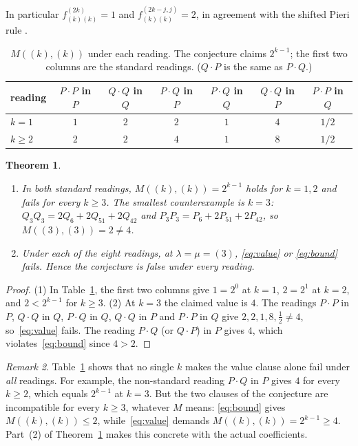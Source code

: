 \documentclass[11pt]{article}
\newtheorem{theorem}{Theorem}
\theoremstyle{definition}
\theoremstyle{remark}
\newtheorem{remark}[theorem]{Remark}
\begin{document}
In particular $f^{(2k)}_{(k)(k)}=1$ and $f^{(2k-j,j)}_{(k)(k)}=2$, in agreement with the
shifted Pieri rule \cite[III (8.15)]{Mac}.

\begin{table}[h]
\centering
\begin{tabular}{lcccccc}
\toprule
reading & $P\cdot P$ in $P$ & $Q\cdot Q$ in $Q$ & $P\cdot Q$ in $P$ & $P\cdot Q$ in $Q$ & $Q\cdot Q$ in $P$ & $P\cdot P$ in $Q$\\
\midrule
$k=1$ & $1$ & $2$ & $2$ & $1$ & $4$ & $1/2$\\
$k\ge2$ & $2$ & $2$ & $4$ & $1$ & $8$ & $1/2$\\
\bottomrule
\end{tabular}
\caption{$M((k),(k))$ under each reading. The conjecture claims $2^{k-1}$; the first two
columns are the standard readings. ($Q\cdot P$ is the same as $P\cdot Q$.)}
\label{tab:M}
\end{table}

\begin{theorem}\label{thm:refute}
\leavevmode
\begin{enumerate}
\item In both standard readings, $M((k),(k))=2^{k-1}$ holds for $k=1,2$ and fails for
every $k\ge3$. The smallest counterexample is $k=3$:
$Q_3Q_3=2Q_6+2Q_{51}+2Q_{42}$ and $P_3P_3=P_6+2P_{51}+2P_{42}$, so $M((3),(3))=2\ne4$.
\item Under each of the eight readings, at $\lambda=\mu=(3)$, \eqref{eq:value} or
\eqref{eq:bound} fails. Hence the conjecture is false under every reading.
\end{enumerate}
\end{theorem}

\begin{proof}
(1) In Table~\ref{tab:M}, the first two columns give $1=2^0$ at $k=1$, $2=2^1$ at $k=2$,
and $2<2^{k-1}$ for $k\ge3$.
(2) At $k=3$ the claimed value is $4$. The readings $P\cdot P$ in $P$, $Q\cdot Q$ in $Q$,
$P\cdot Q$ in $Q$, $Q\cdot Q$ in $P$ and $P\cdot P$ in $Q$ give $2,2,1,8,\tfrac12\neq4$,
so~\eqref{eq:value} fails. The reading $P\cdot Q$ (or $Q\cdot P$) in $P$ gives $4$, which
violates~\eqref{eq:bound} since $4>2$.
\end{proof}

\begin{remark}
Table~\ref{tab:M} shows that no single $k$ makes the value clause alone fail under
\emph{all} readings. For example, the non-standard reading $P\cdot Q$ in $P$ gives $4$ for
every $k\ge2$, which equals $2^{k-1}$ at $k=3$. But the two clauses of the conjecture are
incompatible for every $k\ge3$, whatever $M$ means: \eqref{eq:bound} gives
$M((k),(k))\le2$, while~\eqref{eq:value} demands $M((k),(k))=2^{k-1}\ge4$. Part~(2) of
Theorem~\ref{thm:refute} makes this concrete with the actual coefficients.
\end{remark}
\end{document}
